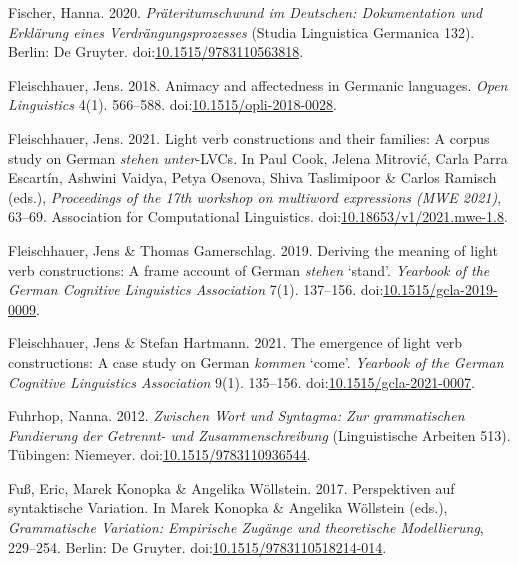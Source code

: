 \leavevmode{}%
Fischer, Hanna. 2020. \emph{Präteritumschwund im {Deutschen}:
{Dokumentation} und {Erklärung} eines {Verdrängungsprozesses}} (Studia
Linguistica Germanica 132). Berlin: De Gruyter.
doi:\href{https://doi.org/10.1515/9783110563818}{10.1515/9783110563818}.

\leavevmode{}%
Fleischhauer, Jens. 2018. Animacy and affectedness in {Germanic}
languages. \emph{Open Linguistics} 4(1). 566--588.
doi:\href{https://doi.org/10.1515/opli-2018-0028}{10.1515/opli-2018-0028}.

\leavevmode{}%
Fleischhauer, Jens. 2021. Light verb constructions and their families: A
corpus study on {G}erman \emph{stehen unter}-{LVC}s. In Paul Cook,
Jelena Mitrović, Carla Parra Escartín, Ashwini Vaidya, Petya Osenova,
Shiva Taslimipoor \& Carlos Ramisch (eds.), \emph{Proceedings of the
17th workshop on multiword expressions (MWE 2021)}, 63--69. Association
for Computational Linguistics.
doi:\href{https://doi.org/10.18653/v1/2021.mwe-1.8}{10.18653/v1/2021.mwe-1.8}.

\leavevmode{}%
Fleischhauer, Jens \& Thomas Gamerschlag. 2019. Deriving the meaning of
light verb constructions: A frame account of {German} \emph{stehen}
{`stand'}. \emph{Yearbook of the German Cognitive Linguistics
Association} 7(1). 137--156.
doi:\href{https://doi.org/10.1515/gcla-2019-0009}{10.1515/gcla-2019-0009}.

\leavevmode{}%
Fleischhauer, Jens \& Stefan Hartmann. 2021. The emergence of light verb
constructions: A case study on {German} \emph{kommen} {`come'}.
\emph{Yearbook of the German Cognitive Linguistics Association} 9(1).
135--156.
doi:\href{https://doi.org/10.1515/gcla-2021-0007}{10.1515/gcla-2021-0007}.

\leavevmode{}%
Fuhrhop, Nanna. 2012. \emph{Zwischen {Wort} und {Syntagma}: Zur
grammatischen {Fundierung} der {Getrennt-} und {Zusammenschreibung}}
(Linguistische Arbeiten 513). Tübingen: Niemeyer.
doi:\href{https://doi.org/10.1515/9783110936544}{10.1515/9783110936544}.

\leavevmode{}%
Fuß, Eric, Marek Konopka \& Angelika Wöllstein. 2017. Perspektiven auf
syntaktische {Variation}. In Marek Konopka \& Angelika Wöllstein (eds.),
\emph{Grammatische {Variation}: {Empirische Zugänge} und theoretische
{Modellierung}}, 229--254. Berlin: De Gruyter.
doi:\href{https://doi.org/10.1515/9783110518214-014}{10.1515/9783110518214-014}.

